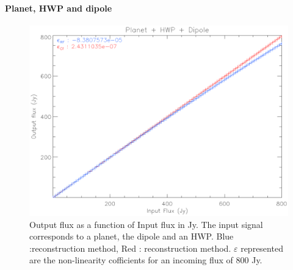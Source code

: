 \paragraph{Planet, HWP and dipole}

\begin{figure}[h]
\center
	\includegraphics[scale=0.55]{Figures/nl-planet-hwp-dipole.eps}
	\caption{Output flux as a function of Input flux in Jy. The input signal corresponds to a planet, the dipole and an HWP. Blue :\rf reconstruction method, Red : \cf reconstruction method. $\varepsilon$  represented are the non-linearity cofficients for an incoming flux of 800 Jy.}
	\label{fig:nl-planet-hwp-dipole}
\end{figure}

